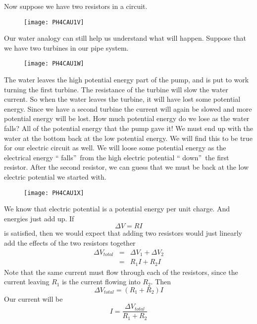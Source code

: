 Now suppose we have two resistors in a circuit. \begin{figure}[h!]
\texttt{[image: PH4CAU1V]}
\end{figure}

Our water analogy can still help us understand what will happen. Suppose
that we have two turbines in our pipe system. \begin{figure}[h!]
\texttt{[image: PH4CAU1W]}
\end{figure}The water leaves the high
potential energy part of the pump, and is put to work turning the first
turbine. The resistance of the turbine will slow the water current. So when
the water leaves the turbine, it will have lost some potential energy. Since
we have a second turbine the current will again be slowed and more potential
energy will be lost. How much potential energy do we lose as the water
falls? All of the potential energy that the pump gave it! We must end up
with the water at the bottom back at the low potential energy. We will find
this to be true for our electric circuit as well. We will loose some
potential energy as the electrical energy \textquotedblleft
falls\textquotedblright\ from the high electric potential \textquotedblleft
down\textquotedblright\ the first resistor. After the second resistor, we
can guess that we must be back at the low electric potential we started with.

\begin{figure}[h!]
\texttt{[image: PH4CAU1X]}
\end{figure}We know that electric potential
is a potential energy per unit charge. And energies just add up. If 
\begin{equation*}
\Delta V=RI
\end{equation*}%
is satisfied, then we would expect that adding two resistors would just
linearly add the effects of the two resistors together%
\begin{eqnarray*}
\Delta V_{total} &=&\Delta V_{1}+\Delta V_{2} \\
&=&R_{1}I+R_{2}I
\end{eqnarray*}%
Note that the same current must flow through each of the resistors, since
the current leaving $R_{1}$ is the current flowing into $R_{2}.$ Then 
\begin{equation*}
\Delta V_{total}=\left( R_{1}+R_{2}\right) I
\end{equation*}%
Our current will be 
\begin{equation*}
I=\frac{\Delta V_{total}}{R_{1}+R_{2}}
\end{equation*}

